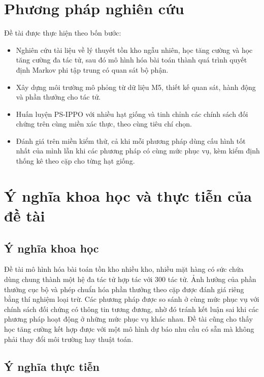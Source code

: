 \section{Phương pháp nghiên cứu}
\label{sec:phuongphap}

Đề tài được thực hiện theo bốn bước:
\begin{itemize}
    \item Nghiên cứu tài liệu về lý thuyết tồn kho ngẫu nhiên, học tăng cường và học tăng cường đa tác tử, sau đó mô hình hóa bài toán thành quá trình quyết định Markov phi tập trung có quan sát bộ phận.
    \item Xây dựng môi trường mô phỏng từ dữ liệu M5, thiết kế quan sát, hành động và phần thưởng cho tác tử.
    \item Huấn luyện PS-IPPO với nhiều hạt giống và tinh chỉnh các chính sách đối chứng trên cùng miền xác thực, theo cùng tiêu chí chọn.
    \item Đánh giá trên miền kiểm thử, cả khi mỗi phương pháp dùng cấu hình tốt nhất của mình lẫn khi các phương pháp có cùng mức phục vụ, kèm kiểm định thống kê theo cặp cho từng hạt giống.
\end{itemize}

\section{Ý nghĩa khoa học và thực tiễn của đề tài}
\label{sec:ynghia}

\subsection{Ý nghĩa khoa học}
\label{subsec:ynghia_khoahoc}

Đề tài mô hình hóa bài toán tồn kho nhiều kho, nhiều mặt hàng có sức chứa dùng chung thành một hệ đa tác tử hợp tác với 300 tác tử. Ảnh hưởng của phần thưởng cục bộ và phép chuẩn hóa phần thưởng theo cặp được đánh giá riêng bằng thí nghiệm loại trừ. Các phương pháp được so sánh ở cùng mức phục vụ với chính sách đối chứng có thông tin tương đương, nhờ đó tránh kết luận sai khi các phương pháp hoạt động ở những mức phục vụ khác nhau. Đề tài cũng cho thấy học tăng cường kết hợp được với một mô hình dự báo nhu cầu có sẵn mà không phải thay đổi môi trường hay thuật toán.

\subsection{Ý nghĩa thực tiễn}
\label{subsec:ynghia_thucte}

